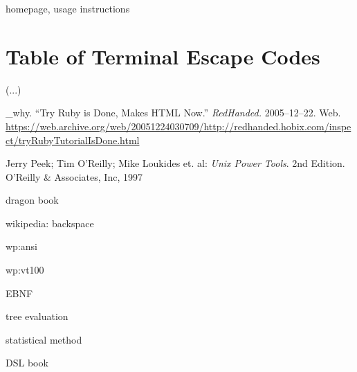 \documentclass[paper=a4,twoside,abstract=on,cleardoublepage=empty,numbers=noenddot,toc=bib,11pt,appendixprefix=true]{scrreprt}
\begin{document}
homepage, usage instructions

\chapter{Table of Terminal Escape Codes}
\label{sec:esc}

(...)

\begin{thebibliography}{99}
        \_why. “Try Ruby is Done, Makes HTML Now.” \emph{RedHanded.} 2005--12--22. Web. \url{https://web.archive.org/web/20051224030709/http://redhanded.hobix.com/inspect/tryRubyTutorialIsDone.html}

    \bibitem{}
        Jerry Peek; Tim O'Reilly; Mike Loukides et. al: \emph{Unix Power Tools}. 2nd Edition. O'Reilly \& Associates, Inc, 1997

    \bibitem{}
        dragon book

    \bibitem{}
        wikipedia: backspace

    \bibitem{}
        wp:ansi

    \bibitem{}
        wp:vt100

    \bibitem{}
        EBNF

    \bibitem{}
        tree evaluation

    \bibitem{}
        statistical method

    \bibitem{}
        DSL book
\end{thebibliography}
\end{document}
